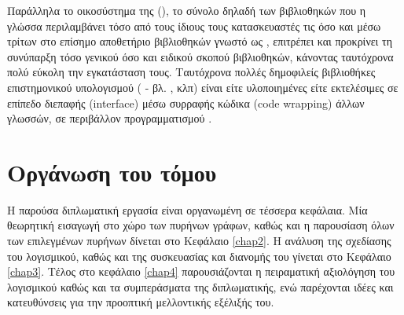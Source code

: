 Παράλληλα το οικοσύστημα της  (), το σύνολο δηλαδή των βιβλιοθηκών που η γλώσσα περιλαμβάνει τόσο από τους ίδιους τους κατασκευαστές τις όσο και μέσω τρίτων στο επίσημο αποθετήριο βιβλιοθηκών γνωστό ως , επιτρέπει και προκρίνει τη συνύπαρξη τόσο γενικού όσο και ειδικού σκοπού βιβλιοθηκών, κάνοντας ταυτόχρονα πολύ εύκολη την εγκατάσταση τους.
Ταυτόχρονα πολλές δημοφιλείς βιβλιοθήκες επιστημονικού υπολογισμού ( - βλ. ,  κλπ) είναι είτε υλοποιημένες είτε εκτελέσιμες σε επίπεδο διεπαφής (interface) μέσω συρραφής κώδικα (code wrapping) άλλων γλωσσών, σε περιβάλλον προγραμματισμού .

\section{Οργάνωση του τόμου}

Η παρούσα διπλωματική εργασία είναι οργανωμένη σε τέσσερα κεφάλαια. Μία θεωρητική εισαγωγή στο χώρο των πυρήνων γράφων, καθώς και η παρουσίαση όλων των επιλεγμένων πυρήνων δίνεται στο Κεφάλαιο \ref{chap2}. Η ανάλυση της σχεδίασης του λογισμικού, καθώς και της συσκευασίας και διανομής του γίνεται στο Κεφάλαιο \ref{chap3}. Τέλος στο κεφάλαιο \ref{chap4} παρουσιάζονται η πειραματική αξιολόγηση του λογισμικού καθώς και τα συμπεράσματα της διπλωματικής, ενώ παρέχονται ιδέες και κατευθύνσεις για την προοπτική μελλοντικής εξέλιξής του.
